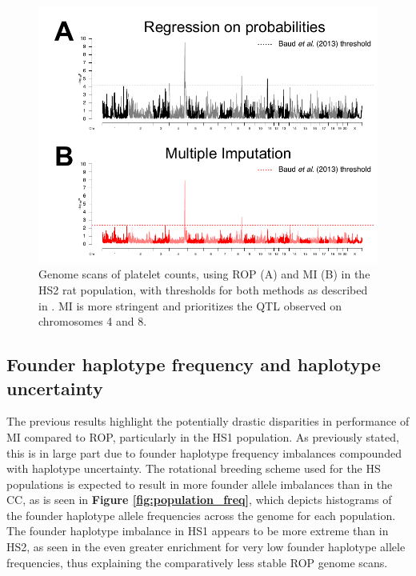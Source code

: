 \begin{figure}
\renewcommand{\familydefault}{\sfdefault}\normalfont
\centering
\includegraphics[width=\textwidth]{figures/4-mi/Amelie_example.pdf}
\caption[Comparison of ROP and MI in large HS rat data set]{Genome scans of platelet counts, using ROP (A) and MI (B) in the HS2 rat population, with thresholds for both methods as described in \cite{Baud2013}. MI is more stringent and prioritizes the QTL observed on chromosomes 4 and 8.\label{fig:AMelie_example}}
\end{figure}

\subsection{Founder haplotype frequency and haplotype uncertainty}
The previous results highlight the potentially drastic disparities in performance of MI compared to ROP, particularly in the HS1 population. As previously stated, this is in large part due to founder haplotype frequency imbalances compounded with haplotype uncertainty. The rotational breeding scheme used for the HS populations is expected to result in more founder allele imbalances than in the CC, as is seen in \textbf{Figure \ref{fig:population_freq}}, which depicts histograms of the founder haplotype allele frequencies across the genome for each population. The founder haplotype imbalance in HS1 appears to be more extreme than in HS2, as seen in the even greater enrichment for very low founder haplotype allele frequencies, thus explaining the comparatively less stable ROP genome scans.

